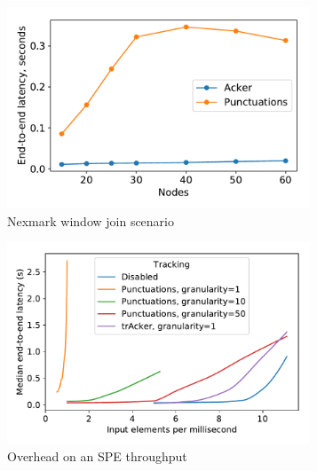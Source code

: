 \begin{figure}[t!]
    \begin{subfigure}[b]{0.25\textwidth}
            \includegraphics[width=0.99\textwidth]{pics/nexmark.pdf}
            \caption{Nexmark window join scenario}
            \label{fig:nexmark}
    \end{subfigure}
    \hspace{5mm}
    \begin{subfigure}[b]{0.25\textwidth}
            \includegraphics[width=0.99\textwidth]{pics/throughput_overhead_50.pdf}
            \caption{Overhead on an SPE throughput}
            \label{throughput_overhead}
    \end{subfigure}
    \hspace{5mm}
    \begin{subfigure}[b]{0.25\textwidth}

\end{subfigure}
\end{figure}
